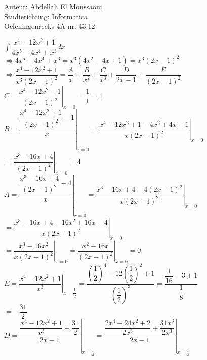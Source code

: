 \documentclass[a4paper]{article}
\begin{document}
  
\noindent \large Auteur: Abdellah El Moussaoui \\
\noindent \large Studierichting: Informatica\\
\noindent \large Oefeningenreeks 4A nr. 43.12\\

\medskip

\normalsize

$\displaystyle\int \dfrac{x^4-12x^2+1}{4x^5-4x^4+x^3}dx$\\

$\Rightarrow 4x^5-4x^4+x^3= x^3\left(4x^2-4x+1\right)=x^3\left(2x-1\right)^2$\\

$\Rightarrow \dfrac{x^4-12x^2+1}{x^3\left(2x-1\right)^2} = \dfrac{A}{x}+\dfrac{B}{x^2}+\dfrac{C}{x^3}+\dfrac{D}{2x-1}+\dfrac{E}{\left(2x-1\right)^2}$\\


$C = \left. \dfrac{x^4-12x^2+1}{\left(2x-1\right)^2}\right|_{x=0}=\dfrac{1}{1}=1$\\

$B = \left. \dfrac{\dfrac{x^4-12x^2+1}{\left(2x-1\right)^2}-1}{x}\right|_{x=0} = \left. \dfrac{x^4-12x^2+1-4x^2+4x-1}{x\left(2x-1\right)^2}\right|_{x=0}$\\

$=\left.\dfrac{x^3-16x+4}{\left(2x-1\right)^2}\right|_{x=0}=4$\\


$A = \left. \dfrac{\dfrac{x^3-16x+4}{\left(2x-1\right)^2}-4}{x}\right|_{x=0}= \left. \dfrac{x^3-16x+4-4\left(2x-1\right)^2}{x\left(2x-1\right)^2}\right|_{x=0}$\\

$= \left. \dfrac{x^3-16x+4-16x^2+16x-4}{x\left(2x-1\right)^2}\right|_{x=0}$\\

$= \left. \dfrac{x^3-16x^2}{x\left(2x-1\right)^2}\right|_{x=0}= \left. \dfrac{x^2-16x}{\left(2x-1\right)^2}\right|_{x=0}=0$\\

$E = \left. \dfrac{x^4-12x^2+1}{x^3} \right|_{x=\dfrac{1}{2}}=\dfrac{\left(\dfrac{1}{2}\right)^4-12\left(\dfrac{1}{2}\right)^2+1}{\left(\dfrac{1}{2}\right)^3}=\dfrac{\dfrac{1}{16}-3+1}{\dfrac{1}{8}}$\\

$= -\dfrac{31}{2}$\\

$D =  \left. \dfrac{\dfrac{x^4-12x^2+1}{x^3}+\dfrac{31}{2}}{2x-1} \right|_{x=\tfrac{1}{2}}= \left. \dfrac{\dfrac{2x^4-24x^2+2}{2x^3}+\dfrac{31x^3}{2x^3}}{2x-1} \right|_{x=\tfrac{1}{2}}$\\
\end{document}
